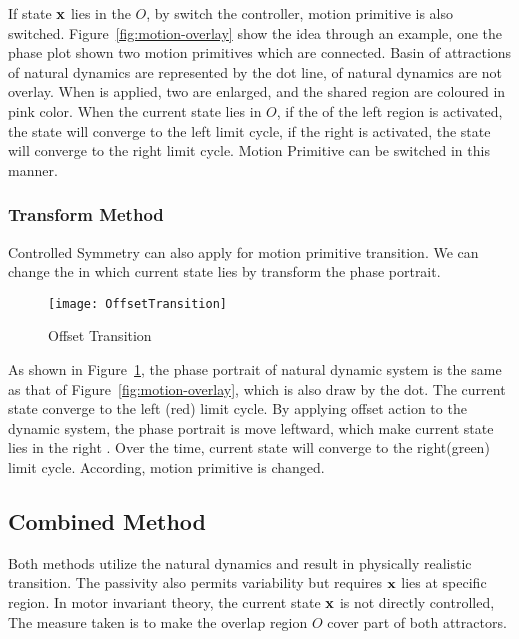 If  state $\mathbf{x}$ lies in the $O$, by switch the \cpg controller, motion primitive is also switched.
Figure~\ref{fig:motion-overlay} show the idea through an example, one the phase plot shown two motion primitives which are connected.
Basin of attractions of natural dynamics are represented by the dot line, \boa of natural dynamics are not overlay.
When \cpg is applied, two \boa are enlarged, and the shared region are coloured in pink color.
When the current state lies in $O$, if the \cpg of the left region is activated, the state will converge to the left limit cycle,
if the right \cpg is activated, the state will converge to the right limit cycle.
Motion Primitive can be switched in this manner.






\subsubsection*{Transform Method}
Controlled Symmetry can also apply for motion primitive transition.
We can change the \boa in which current state lies by transform the phase portrait.

\begin{figure}[!htbp]
  \begin{center}
      \texttt{[image: OffsetTransition]}
    \caption{Offset Transition}
    \label{fig:transform-offset}
  \end{center}
\end{figure}




As shown in Figure~\ref{fig:transform-offset}, the phase portrait of natural dynamic system is the same as that of Figure~\ref{fig:motion-overlay}, which is also draw by the dot.
The current state converge to the left (red) limit cycle.
By applying offset action to the dynamic system, the phase portrait is move leftward, which make current state lies in the right \boa.
Over the time, current state will converge to the right(green) limit cycle.
According, motion primitive is changed.







\subsection{Combined Method}
Both methods utilize the natural dynamics and  result in physically realistic transition.
The passivity also permits variability but requires $\mathbf{x}$ lies at specific region.
In motor invariant theory, the current state $\mathbf{x}$ is not directly controlled,
The measure taken is to make the overlap region $O$ cover part of both attractors.

